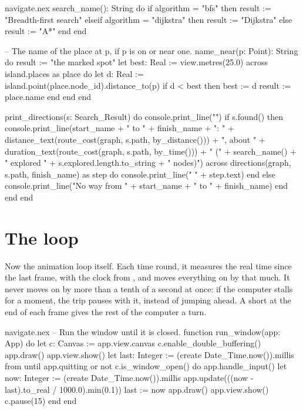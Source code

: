 \begin{continued}{navigate.nex}
  search_name(): String do
    if algorithm = "bfs" then
      result := "Breadth-first search"
    elseif algorithm = "dijkstra" then
      result := "Dijkstra"
    else
      result := "A*"
    end
  end

  -- The name of the place at p, if p is on or near one.
  name_near(p: Point): String do
    result := "the marked spot"
    let best: Real := view.metres(25.0)
    across island.places as place do
      let d: Real := island.point(place.node_id).distance_to(p)
      if d < best then
        best := d
        result := place.name
      end
    end
  end

  print_directions(s: Search_Result) do
    console.print_line("")
    if s.found() then
      console.print_line(start_name + " to " + finish_name + ": "
        + distance_text(route_cost(graph, s.path, by_distance())) + ", about "
        + duration_text(route_cost(graph, s.path, by_time())) + " ("
        + search_name() + " explored " + s.explored.length.to_string + " nodes)")
      across directions(graph, s.path, finish_name) as step do
        console.print_line("  " + step.text)
      end
    else
      console.print_line("No way from " + start_name + " to " + finish_name)
    end
  end
end
\end{continued}

\section{The loop}

Now the animation loop itself. Each time round, it measures the real time
since the last frame, with the clock from , and moves
everything on by that much. It never moves on by more than a tenth of a
second at once: if the computer stalls for a moment, the trip pauses with
it, instead of jumping ahead. A short  at the end of each frame
gives the rest of the computer a turn.

\begin{append}{navigate.nex}
-- Run the window until it is closed.
function run_window(app: App) do
  let c: Canvas := app.view.canvas
  c.enable_double_buffering()
  app.draw()
  app.view.show()
  let last: Integer := (create Date_Time.now()).millis
  from
  until
    app.quitting or not c.is_window_open()
  do
    app.handle_input()
    let now: Integer := (create Date_Time.now()).millis
    app.update(((now - last).to_real / 1000.0).min(0.1))
    last := now
    app.draw()
    app.view.show()
    c.pause(15)
  end
end
\end{append}

